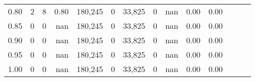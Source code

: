 \begin{tabular}{rrrrrrrrrrrrrr}
0.80 &       2 &      8 &  0.80 &  180,245 &        0 &  33,825 &       0 &   nan &  0.00 &      0.00 \\
0.85 &       0 &      0 &   nan &  180,245 &        0 &  33,825 &       0 &   nan &  0.00 &      0.00 \\
0.90 &       0 &      0 &   nan &  180,245 &        0 &  33,825 &       0 &   nan &  0.00 &      0.00 \\
0.95 &       0 &      0 &   nan &  180,245 &        0 &  33,825 &       0 &   nan &  0.00 &      0.00 \\
1.00 &       0 &      0 &   nan &  180,245 &        0 &  33,825 &       0 &   nan &  0.00 &      0.00 \\
\bottomrule
\end{tabular}
